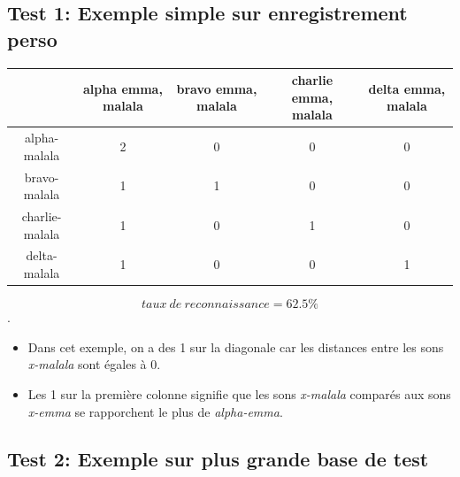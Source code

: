 \documentclass[a4paper,12pt]{article}
\begin{document}
	\subsection{Test 1: Exemple simple sur enregistrement perso}
	\begin{table}[h]
		\begin{tabular}{|c|c|c|c|c|}
			\hline
			& alpha emma, malala & bravo emma, malala & charlie emma, malala & delta emma, malala\\
			\hline
			alpha-malala & 2 & 0 & 0 & 0 \\
			\hline
			bravo-malala & 1 & 1 & 0 & 0 \\
			\hline
			charlie-malala & 1 & 0 & 1 & 0 \\
			\hline
			delta-malala & 1 & 0 & 0 & 1 \\
			\hline
		\end{tabular}
	\end{table}
	\[
   	taux\ de\ reconnaissance = 62.5 \%
	\].
	\begin{itemize}
		\item Dans cet exemple, on a des 1 sur la diagonale car les distances entre les sons \textit{x-malala} sont égales à 0.\\
		\item Les 1 sur la première colonne signifie que les sons \textit{x-malala} comparés aux sons \textit{x-emma} se rapporchent le plus de \textit{alpha-emma}.
	\end{itemize}

	\subsection{Test 2: Exemple sur plus grande base de test}
\end{document}
